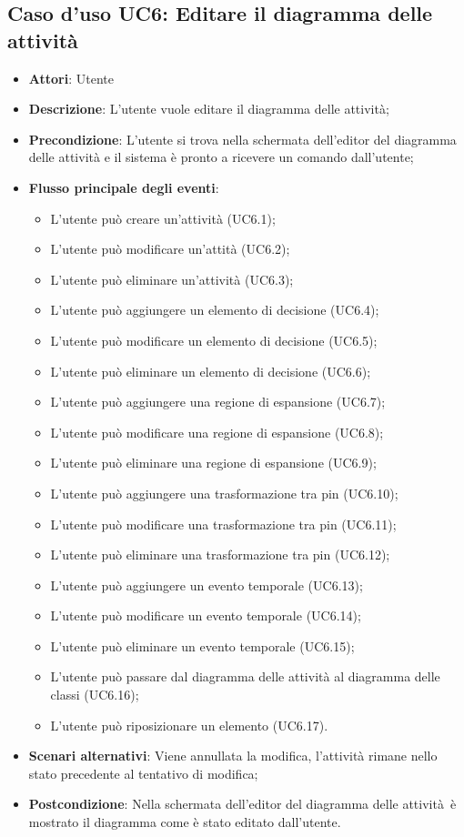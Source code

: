 \documentclass[../AnalisiDeiRequisiti.tex]{subfiles}
\begin{document}
			\subsection{Caso d'uso UC6: Editare il diagramma delle attività }
			\begin{itemize}
				\item \textbf{Attori}: Utente
				\item \textbf{Descrizione}: L'utente vuole editare il diagramma delle attività;
				\item \textbf{Precondizione}: L'utente si trova nella schermata dell'editor del diagramma delle attività e il sistema è pronto a ricevere un comando dall'utente;
				\item \textbf{Flusso principale degli eventi}: \begin{itemize}
					\item L'utente può creare un'attività (UC6.1);
					\item L'utente può modificare un'attità (UC6.2);
					\item L'utente può eliminare un'attività (UC6.3);
					\item L'utente può aggiungere un elemento di decisione (UC6.4);
					\item L'utente può modificare un elemento di decisione (UC6.5);
					\item L'utente può eliminare un elemento di decisione (UC6.6);
					\item L'utente può aggiungere una regione di espansione (UC6.7);
					\item L'utente può modificare una regione di espansione (UC6.8);
					\item L'utente può eliminare una regione di espansione (UC6.9);
					\item L'utente può aggiungere una trasformazione tra pin (UC6.10);
					\item L'utente può modificare una trasformazione tra pin (UC6.11);
					\item L'utente può eliminare una trasformazione tra pin (UC6.12);
					\item L'utente può aggiungere un evento temporale (UC6.13);
					\item L'utente può modificare un evento temporale (UC6.14);
					\item L'utente può eliminare un evento temporale (UC6.15);
					\item L'utente può passare dal diagramma delle attività al diagramma delle classi (UC6.16);
					\item L'utente può riposizionare un elemento (UC6.17).
				\end{itemize}
					\item \textbf{Scenari alternativi}: Viene annullata la modifica, l'attività rimane nello stato precedente al tentativo di modifica;
					\item \textbf{Postcondizione}: Nella schermata dell'editor del diagramma delle attività è mostrato il diagramma come è stato editato dall'utente.
				\end{itemize}
\end{document}

